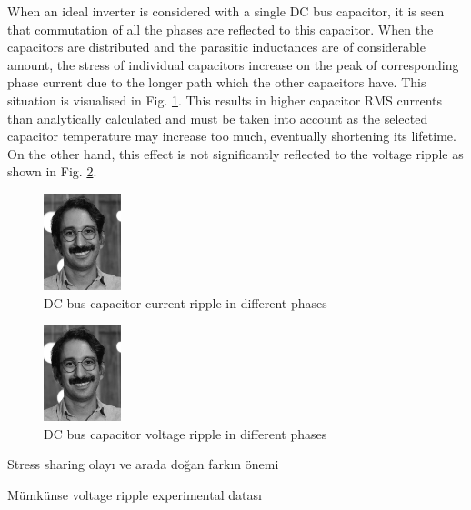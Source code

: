 When an ideal inverter is considered with a single DC bus capacitor, it is seen that commutation of all the phases are reflected to this capacitor. When the capacitors are distributed and the parasitic inductances are of considerable amount, the stress of individual capacitors increase on the peak of corresponding phase current due to the longer path which the other capacitors have. This situation is visualised in Fig. \ref{fig:single_module_curr_ripple}. This results in higher capacitor RMS currents than analytically calculated and must be taken into account as the selected capacitor temperature may increase too much, eventually shortening its lifetime. On the other hand, this effect is not significantly reflected to the voltage ripple as shown in Fig. \ref{fig:single_module_volt_ripple}.

\begin{figure}[h]
    \centering
    \includegraphics[width=0.2\textwidth]{figures/single_module_curr_ripple.jpg}
    \caption{DC bus capacitor current ripple in different phases}
    \label{fig:single_module_curr_ripple}
\end{figure}

\begin{figure}[h]
    \centering
    \includegraphics[width=0.2\textwidth]{figures/single_module_volt_ripple.jpg}
    \caption{DC bus capacitor voltage ripple in different phases}
    \label{fig:single_module_volt_ripple}
\end{figure}

Stress sharing olayı ve arada doğan farkın önemi

Mümkünse voltage ripple experimental datası

